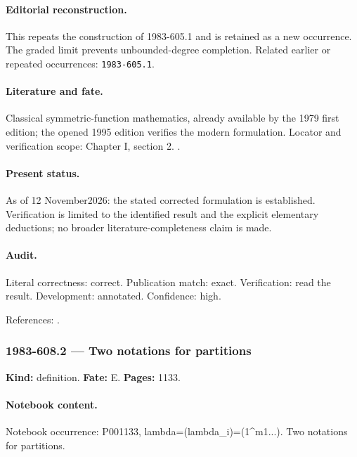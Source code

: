 \paragraph{Editorial reconstruction.} This repeats the construction of 1983-605.1 and is retained as a new occurrence. The graded limit prevents unbounded-degree completion. Related earlier or repeated occurrences: \texttt{1983-605.1}.

\paragraph{Literature and fate.} Classical symmetric-function mathematics, already available by the 1979 first edition; the opened 1995 edition verifies the modern formulation. Locator and verification scope: Chapter I, section 2. \cite{macdonald1995symmetric}.

\paragraph{Present status.} As of 12 November2026: the stated corrected formulation is established. Verification is limited to the identified result and the explicit elementary deductions; no broader literature-completeness claim is made.

\paragraph{Audit.} Literal correctness: correct. Publication match: exact. Verification: read the result. Development: annotated. Confidence: high.

\noindent References: \citep{macdonald1995symmetric}.\par

\subsubsection{1983-608.2 --- Two notations for partitions}

\label{item:1983-608.2}

\noindent\textbf{Kind:} definition. \textbf{Fate:} E. \textbf{Pages:} 1133.\par

\paragraph{Notebook content.} Notebook occurrence: P001133, lambda=(lambda_i)=(1^m1...). Two notations for partitions.

